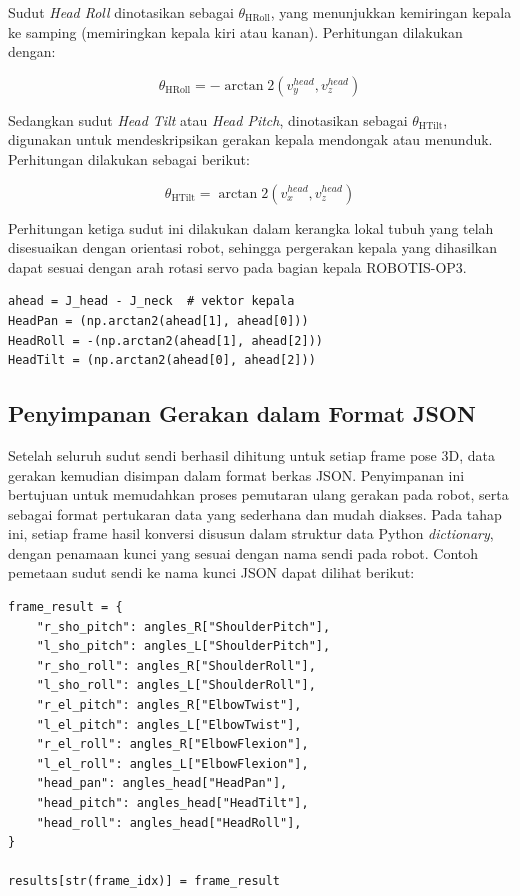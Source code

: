 Sudut \textit{Head Roll} dinotasikan sebagai $\theta_{\text{HRoll}}$, yang menunjukkan kemiringan kepala ke samping (memiringkan kepala kiri atau kanan). Perhitungan dilakukan dengan:

\begin{equation}
\theta_{\text{HRoll}} = -\arctan2\left(v^{head}_y, v^{head}_z\right)
\end{equation}

Sedangkan sudut \textit{Head Tilt} atau \textit{Head Pitch}, dinotasikan sebagai $\theta_{\text{HTilt}}$, digunakan untuk mendeskripsikan gerakan kepala mendongak atau menunduk. Perhitungan dilakukan sebagai berikut:

\begin{equation}
\theta_{\text{HTilt}} = \arctan2\left(v^{head}_x, v^{head}_z\right)
\end{equation}

Perhitungan ketiga sudut ini dilakukan dalam kerangka lokal tubuh yang telah disesuaikan dengan orientasi robot, sehingga pergerakan kepala yang dihasilkan dapat sesuai dengan arah rotasi servo pada bagian kepala ROBOTIS-OP3.

\begin{lstlisting}[style=plainbox, caption={Implementasi perhitungan sudut kepala}]
ahead = J_head - J_neck  # vektor kepala
HeadPan = (np.arctan2(ahead[1], ahead[0]))
HeadRoll = -(np.arctan2(ahead[1], ahead[2]))
HeadTilt = (np.arctan2(ahead[0], ahead[2]))
\end{lstlisting}
\subsection{Penyimpanan Gerakan dalam Format JSON}

Setelah seluruh sudut sendi berhasil dihitung untuk setiap frame pose 3D, data gerakan kemudian disimpan dalam format berkas {JSON}. Penyimpanan ini bertujuan untuk memudahkan proses pemutaran ulang gerakan pada robot, serta sebagai format pertukaran data yang sederhana dan mudah diakses. Pada tahap ini, setiap frame hasil konversi disusun dalam struktur data Python \textit{dictionary}, dengan penamaan kunci yang sesuai dengan nama sendi pada robot. Contoh pemetaan sudut sendi ke nama kunci JSON dapat dilihat berikut:

\begin{lstlisting}[style=plainbox, caption={Pemetaan hasil sudut ke format JSON}]
frame_result = {
    "r_sho_pitch": angles_R["ShoulderPitch"],
    "l_sho_pitch": angles_L["ShoulderPitch"],
    "r_sho_roll": angles_R["ShoulderRoll"],
    "l_sho_roll": angles_L["ShoulderRoll"],
    "r_el_pitch": angles_R["ElbowTwist"],
    "l_el_pitch": angles_L["ElbowTwist"],
    "r_el_roll": angles_R["ElbowFlexion"],
    "l_el_roll": angles_L["ElbowFlexion"],
    "head_pan": angles_head["HeadPan"],
    "head_pitch": angles_head["HeadTilt"],
    "head_roll": angles_head["HeadRoll"],
}

results[str(frame_idx)] = frame_result
\end{lstlisting}

